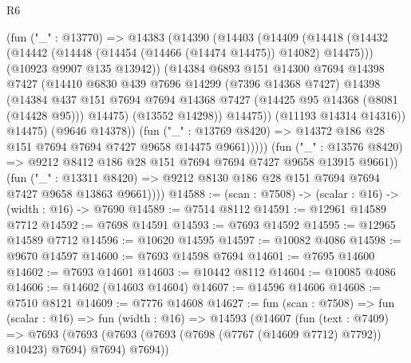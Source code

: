 \begin{lexlean}{R6}
\begin{coremodule}
                    (fun ("_" : @13770) =>
                    @14383
                      (@14390
                        (@14403
                          (@14409
                            (@14418
                              (@14432
                                (@14442 (@14448 (@14454 (@14466 (@14474 @14475)) @14082) @14475)))
                              (@10923 @9907 @135 @13942))
                            (@14384
                              @6893
                              @151
                              @14300
                              @7694
                              @14398
                              @7427
                              (@14410
                                @6830
                                @439
                                @7696
                                @14299
                                (@7396 @14368 @7427)
                                @14398
                                (@14384
                                  @437
                                  @151
                                  @7694
                                  @7694
                                  @14368
                                  @7427
                                  (@14425 @95 @14368 (@8081 (@14428 @95)))
                                  @14475)
                                (@13552 @14298))
                              @14475))
                          (@11193 @14314 @14316))
                        @14475)
                      (@9646 @14378))
                    (fun ("_" : @13769 @8420) =>
                    @14372 @186 @28 @151 @7694 @7694 @7427 @9658 @14475 @9661)))))
            (fun ("_" : @13576 @8420) =>
            @9212 @8412 @186 @28 @151 @7694 @7694 @7427 @9658 @13915 @9661))
          (fun ("_" : @13311 @8420) =>
          @9212 @8130 @186 @28 @151 @7694 @7694 @7427 @9658 @13863 @9661))))
@14588 := (scan : @7508) -> (scalar : @16) -> (width : @16) -> @7690
@14589 := @7514 @8112
@14591 := @12961 @14589 @7712
@14592 := @7698 @14591
@14593 := @7693 @14592
@14595 := @12965 @14589 @7712
@14596 := @10620 @14595
@14597 := @10082 @4086
@14598 := @9670 @14597
@14600 := @7693 @14598 @7694
@14601 := @7695 @14600
@14602 := @7693 @14601
@14603 := @10442 @8112
@14604 := @10085 @4086
@14606 := @14602 (@14603 @14604)
@14607 := @14596 @14606
@14608 := @7510 @8121
@14609 := @7776 @14608
@14627 := fun (scan : @7508) =>
  fun (scalar : @16) =>
  fun (width : @16) =>
  @14593
    (@14607
      (fun (text : @7409) =>
      @7693 (@7693 (@7693 (@7693 (@7698 (@7767 (@14609 @7712) @7792)) @10423) @7694) @7694) @7694))

\end{coremodule}
\end{lexlean}
